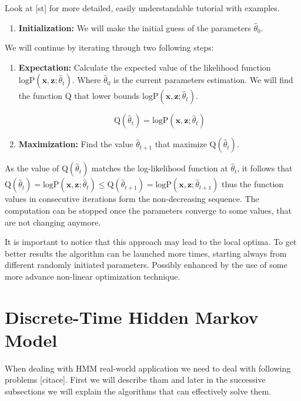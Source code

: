 \documentclass[thesis=M,english]{FITthesis}[2012/10/20]
\begin{document}
Look at [st] for more detailed, easily understandable tutorial with examples.    

\begin{enumerate}
\item \textbf{Initialization:} We will make the initial guess of the parameters $\hat \theta_{0} $.
\end{enumerate} 

We will continue by iterating through two following steps: 

\begin{enumerate}[resume]
\item \textbf{Expectation:} Calculate the expected value of the likelihood function $\mathrm{logP}(\mathbf{x},\mathbf{z};\hat \theta_{t})$. Where $\hat \theta_{0}$ is the current parameters estimation. We will find the function $\mathrm{Q}$ that lower bounds $\mathrm{logP}(\mathbf{x},\mathbf{z};\hat \theta_{t})$.

\begin{equation}\label{eq:exp}
 \mathrm{Q}(\hat\theta_{t}) =  \mathrm{logP}(\mathbf{x},\mathbf{z};\hat \theta_{t})
\end{equation}

\item \textbf{Maximization:} Find the value $\hat\theta_{t+1}$ that maximize $\mathrm{Q}(\hat\theta_{t})$.  
\end{enumerate}  

As the value of $\mathrm{Q}(\hat\theta_{t})$ matches the log-likelihood function at $\hat\theta_{t}$, it follows that $ \mathrm{Q}(\hat\theta_{t}) =  \mathrm{logP}(\mathbf{x},\mathbf{z};\hat \theta_{t}) \leq \mathrm{Q}(\hat\theta_{t+1}) =  \mathrm{logP}(\mathbf{x},\mathbf{z};\hat \theta_{t+1}) $ thus the function values in consecutive iterations form the non-decreasing sequence. The computation can be stopped once the parameters converge to some values, that are not changing anymore.  

It is important to notice that this approach may lead to the local optima. To get better results the algorithm can be launched more times, starting always from different randomly initiated parameters. Possibly enhanced by the use of some more advance non-linear optimization technique.

\section{Discrete-Time Hidden Markov Model}\label{sec:3p}
When dealing with HMM real-world application we need to deal with following problems [citace]. First we will describe tham and later in the successive subsections we will explain the algorithms that can effectively solve them. 
\end{document}
